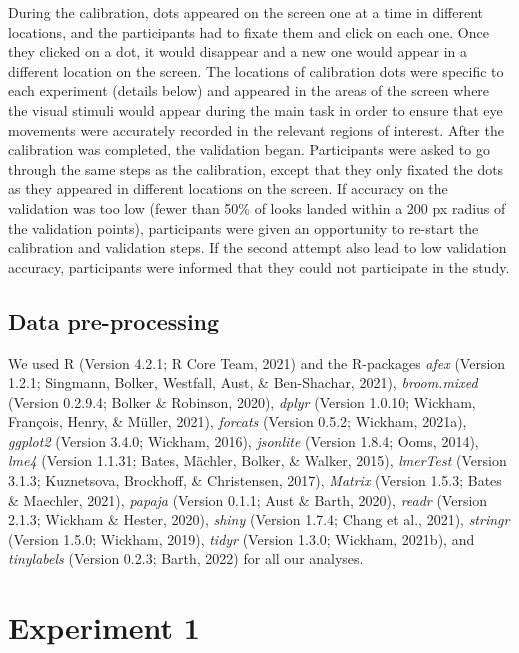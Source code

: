 \documentclass[
  man,floatsintext]{apa6}
\begin{document}
During the calibration, dots appeared on the screen one at a time in
different locations, and the participants had to fixate them and click
on each one. Once they clicked on a dot, it would disappear and a new
one would appear in a different location on the screen. The locations of
calibration dots were specific to each experiment (details below) and
appeared in the areas of the screen where the visual stimuli would
appear during the main task in order to ensure that eye movements were
accurately recorded in the relevant regions of interest. After the
calibration was completed, the validation began. Participants were asked
to go through the same steps as the calibration, except that they only
fixated the dots as they appeared in different locations on the screen.
If accuracy on the validation was too low (fewer than 50\% of looks
landed within a 200 px radius of the validation points),
participants were given an opportunity to re-start the calibration and
validation steps. If the second attempt also lead to low validation
accuracy, participants were informed that they could not participate in
the study.

\hypertarget{data-pre-processing}{%
\subsection{Data pre-processing}\label{data-pre-processing}}

We used R (Version 4.2.1; R Core Team, 2021) and the R-packages \emph{afex} (Version 1.2.1; Singmann, Bolker, Westfall, Aust, \& Ben-Shachar, 2021), \emph{broom.mixed} (Version 0.2.9.4; Bolker \& Robinson, 2020), \emph{dplyr} (Version 1.0.10; Wickham, François, Henry, \& Müller, 2021), \emph{forcats} (Version 0.5.2; Wickham, 2021a), \emph{ggplot2} (Version 3.4.0; Wickham, 2016), \emph{jsonlite} (Version 1.8.4; Ooms, 2014), \emph{lme4} (Version 1.1.31; Bates, Mächler, Bolker, \& Walker, 2015), \emph{lmerTest} (Version 3.1.3; Kuznetsova, Brockhoff, \& Christensen, 2017), \emph{Matrix} (Version 1.5.3; Bates \& Maechler, 2021), \emph{papaja} (Version 0.1.1; Aust \& Barth, 2020), \emph{readr} (Version 2.1.3; Wickham \& Hester, 2020), \emph{shiny} (Version 1.7.4; Chang et al., 2021), \emph{stringr} (Version 1.5.0; Wickham, 2019), \emph{tidyr} (Version 1.3.0; Wickham, 2021b), and \emph{tinylabels} (Version 0.2.3; Barth, 2022) for all our analyses.

\hypertarget{experiment-1}{%
\section{Experiment 1}\label{experiment-1}}
\end{document}
